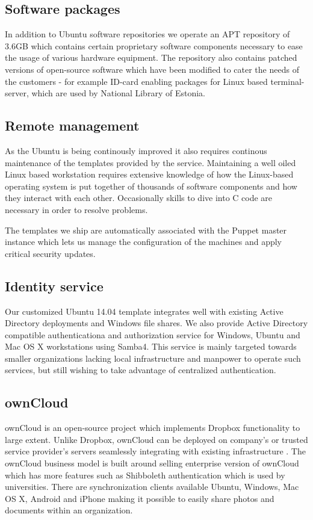 \documentclass{article}
\begin{document}
\subsection{Software packages}

In addition to Ubuntu software repositories 
we operate an APT repository of 3.6GB which contains
certain proprietary software components necessary
to ease the usage of various hardware equipment.
The repository also contains patched versions of
open-source software which have been modified to cater the
needs of the customers - for example
ID-card enabling packages for Linux based terminal-server,
which are used by National Library of Estonia.

\subsection{Remote management}

As the Ubuntu is being continously improved it also requires
continous maintenance of the templates provided by the service.
Maintaining a well oiled Linux based workstation
requires extensive knowledge of
how the Linux-based operating system is put together of 
thousands of software components and how they interact with each other.
Occasionally skills to dive into C code are necessary
in order to resolve problems.

The templates we ship are automatically associated with
the Puppet master instance which lets us manage
the configuration of the machines and apply critical security updates.


\subsection{Identity service}

Our customized Ubuntu 14.04 template integrates
well with existing Active Directory deployments
and Windows file shares.
We also provide Active Directory compatible
authenticationa and authorization service
for Windows, Ubuntu and Mac OS X workstations using Samba4.
This service is mainly targeted towards
smaller organizations lacking local
infrastructure and manpower to operate such services,
but still wishing to take advantage of centralized
authentication.

\subsection{ownCloud}

ownCloud
is an open-source project which implements
Dropbox functionality to large extent.
Unlike Dropbox, ownCloud can be deployed
on company's or trusted service provider's servers
seamlessly integrating with existing infrastructure
\cite{deploying-owncloud}.
The ownCloud business model is built around selling
enterprise version of ownCloud which has more features
such as Shibboleth authentication which is used by universities.
\cite{owncloud-closes-2.5-million-usd}
There are synchronization clients available
Ubuntu, Windows, Mac OS X, Android and iPhone
making it possible to easily share photos and documents within
an organization.
\end{document}
